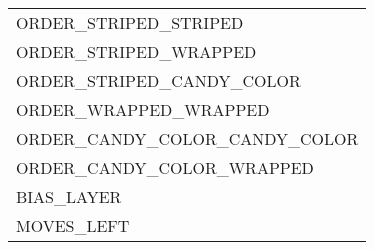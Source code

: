 \begin{tabular}{l}
    ORDER\_STRIPED\_STRIPED \\ 
    ORDER\_STRIPED\_WRAPPED \\ 
    ORDER\_STRIPED\_CANDY\_COLOR \\ 
    ORDER\_WRAPPED\_WRAPPED \\ 
    ORDER\_CANDY\_COLOR\_CANDY\_COLOR \\ 
    ORDER\_CANDY\_COLOR\_WRAPPED\\
    
    BIAS\_LAYER \\%
    MOVES\_LEFT \\%

    \bottomrule
    \end{tabular}
